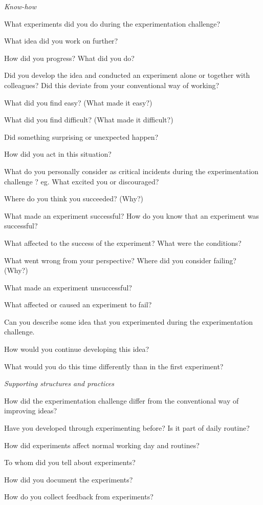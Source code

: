 \noindent \emph{Know-how}
\vspace{-3mm} 
\begin{list}{*}{}
\setlength{\itemsep}{-3pt}
 \item What experiments did you do during the experimentation challenge?
 \item What idea did you work on further?
 \item How did you progress? What did you do?
 \item Did you develop the idea and conducted an experiment alone or together with colleagues? Did this deviate from your conventional way of working? 
\newline
 \item What did you find easy? (What made it easy?)
 \item What did you find difficult? (What made it difficult?)
 \item Did something surprising or unexpected happen?
 \item How did you act in this situation?
 \item What do you personally consider as critical incidents during the experimentation challenge ? eg. What excited you or discouraged?
 \item Where do you think you succeeded? (Why?)
 \item What made an experiment successful? How do you know that an experiment was successful?
 \item What affected to the success of the experiment? What were the conditions?
 \item What went wrong from your perspective? Where did you consider failing? (Why?) 
 \item What made an experiment unsuccessful? 
 \item What affected or caused an experiment to fail? 
 \item Can you describe some idea that you experimented during the experimentation challenge. 
 \item How would you continue developing this idea?
 \item What would you do this time differently than in the first experiment?
 
\end{list}

\noindent\emph{Supporting structures and practices}
\vspace{-3mm} 
\begin{list}{*}{}
\setlength{\itemsep}{-3pt}
    \item How did the experimentation challenge differ from the conventional way of improving ideas?
    \item Have you developed through experimenting before? Is it part of daily routine?
    \item How did experiments affect normal working day and routines?
    \item To whom did you tell about experiments?
    \item How did you document the experiments?
    \item How do you collect feedback from experiments?
    \medskip
\end{list}

